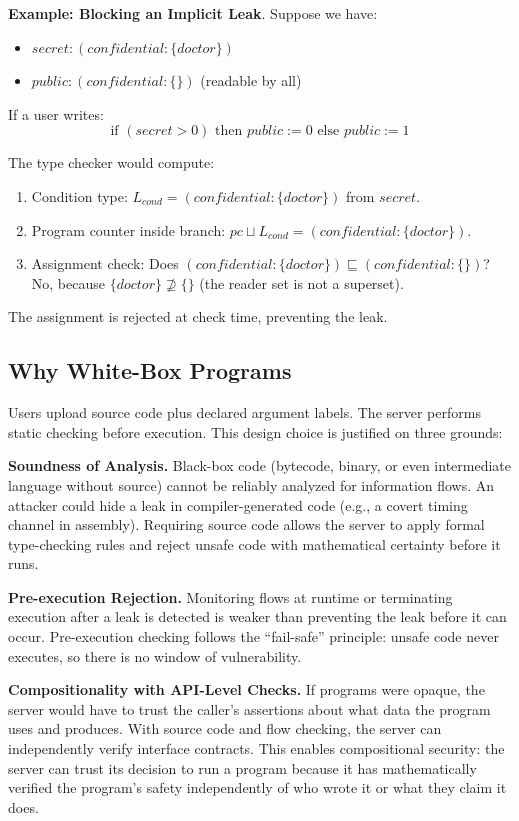 \textbf{Example: Blocking an Implicit Leak}. Suppose we have:
\begin{itemize}
    \item $secret: (confidential:\{doctor\})$
    \item $public: (confidential:\{\})$ (readable by all)
\end{itemize}

If a user writes:
\[\text{if } (secret > 0) \text{ then } public := 0 \text{ else } public := 1\]

The type checker would compute:
\begin{enumerate}
    \item Condition type: $L_{cond} = (confidential:\{doctor\})$ from $secret$.
    \item Program counter inside branch: $pc \sqcup L_{cond} = (confidential:\{doctor\})$.
    \item Assignment check: Does $(confidential:\{doctor\}) \sqsubseteq (confidential:\{\})$? No, because $\{doctor\} \not\supseteq \{\}$ (the reader set is not a superset). \times
\end{enumerate}

The assignment is rejected at check time, preventing the leak.

\subsection{Why White-Box Programs}

Users upload source code plus declared argument labels. The server performs static checking before execution. This design choice is justified on three grounds:

\textbf{Soundness of Analysis.} Black-box code (bytecode, binary, or even intermediate language without source) cannot be reliably analyzed for information flows. An attacker could hide a leak in compiler-generated code (e.g., a covert timing channel in assembly). Requiring source code allows the server to apply formal type-checking rules and reject unsafe code with mathematical certainty before it runs.

\textbf{Pre-execution Rejection.} Monitoring flows at runtime or terminating execution after a leak is detected is weaker than preventing the leak before it can occur. Pre-execution checking follows the ``fail-safe'' principle: unsafe code never executes, so there is no window of vulnerability.

\textbf{Compositionality with API-Level Checks.} If programs were opaque, the server would have to trust the caller's assertions about what data the program uses and produces. With source code and flow checking, the server can independently verify interface contracts. This enables compositional security: the server can trust its decision to run a program because it has mathematically verified the program's safety independently of who wrote it or what they claim it does.

